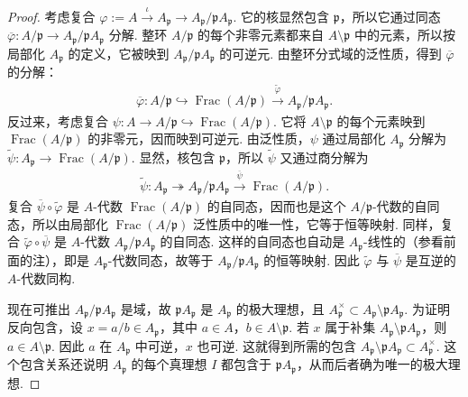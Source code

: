 \begin{proof}
考虑复合 $\varphi:=A\xrightarrow{\iota}A_{\mathfrak p}\longrightarrow A_{\mathfrak p}/\mathfrak pA_{\mathfrak p}$. 它的核显然包含 $\mathfrak p$，所以它通过同态 $\overline\varphi:A/\mathfrak p\longrightarrow A_{\mathfrak p}/\mathfrak pA_{\mathfrak p}$ 分解. 整环 $A/\mathfrak p$ 的每个非零元素都来自 $A\setminus\mathfrak p$ 中的元素，所以按局部化 $A_{\mathfrak p}$ 的定义，它被映到 $A_{\mathfrak p}/\mathfrak pA_{\mathfrak p}$ 的可逆元. 由整环分式域的泛性质，得到 $\overline\varphi$ 的分解：
\begin{align*}
\overline\varphi:A/\mathfrak p\hookrightarrow\operatorname{Frac}(A/\mathfrak p)
\xrightarrow{\widetilde\varphi}A_{\mathfrak p}/\mathfrak pA_{\mathfrak p}.
\end{align*}
反过来，考虑复合 $\psi:A\longrightarrow A/\mathfrak p\hookrightarrow\operatorname{Frac}(A/\mathfrak p)$. 它将 $A\setminus\mathfrak p$ 的每个元素映到 $\operatorname{Frac}(A/\mathfrak p)$ 的非零元，因而映到可逆元. 由泛性质，$\psi$ 通过局部化 $A_{\mathfrak p}$ 分解为 $\widetilde\psi:A_{\mathfrak p}\longrightarrow\operatorname{Frac}(A/\mathfrak p)$. 显然，核包含 $\mathfrak p$，所以 $\widetilde\psi$ 又通过商分解为
\begin{align*}
\widetilde\psi:A_{\mathfrak p}\twoheadrightarrow A_{\mathfrak p}/\mathfrak pA_{\mathfrak p}
\xrightarrow{\overline\psi}\operatorname{Frac}(A/\mathfrak p).
\end{align*}
复合 $\overline\psi\circ\widetilde\varphi$ 是 $A$-代数 $\operatorname{Frac}(A/\mathfrak p)$ 的自同态，因而也是这个 $A/\mathfrak p$-代数的自同态，所以由局部化 $\operatorname{Frac}(A/\mathfrak p)$ 泛性质中的唯一性，它等于恒等映射. 同样，复合 $\widetilde\varphi\circ\overline\psi$ 是 $A$-代数 $A_{\mathfrak p}/\mathfrak pA_{\mathfrak p}$ 的自同态. 这样的自同态也自动是 $A_{\mathfrak p}$-线性的（参看前面的注），即是 $A_{\mathfrak p}$-代数同态，故等于 $A_{\mathfrak p}/\mathfrak pA_{\mathfrak p}$ 的恒等映射. 因此 $\widetilde\varphi$ 与 $\overline\psi$ 是互逆的 $A$-代数同构.

现在可推出 $A_{\mathfrak p}/\mathfrak pA_{\mathfrak p}$ 是域，故 $\mathfrak pA_{\mathfrak p}$ 是 $A_{\mathfrak p}$ 的极大理想，且 $A_{\mathfrak p}^\times\subset A_{\mathfrak p}\setminus\mathfrak pA_{\mathfrak p}$. 为证明反向包含，设 $x=a/b\in A_{\mathfrak p}$，其中 $a\in A$，$b\in A\setminus\mathfrak p$. 若 $x$ 属于补集 $A_{\mathfrak p}\setminus\mathfrak pA_{\mathfrak p}$，则 $a\in A\setminus\mathfrak p$. 因此 $a$ 在 $A_{\mathfrak p}$ 中可逆，$x$ 也可逆. 这就得到所需的包含 $A_{\mathfrak p}\setminus\mathfrak pA_{\mathfrak p}\subset A_{\mathfrak p}^\times$. 这个包含关系还说明 $A_{\mathfrak p}$ 的每个真理想 $I$ 都包含于 $\mathfrak pA_{\mathfrak p}$，从而后者确为唯一的极大理想.
\end{proof}
